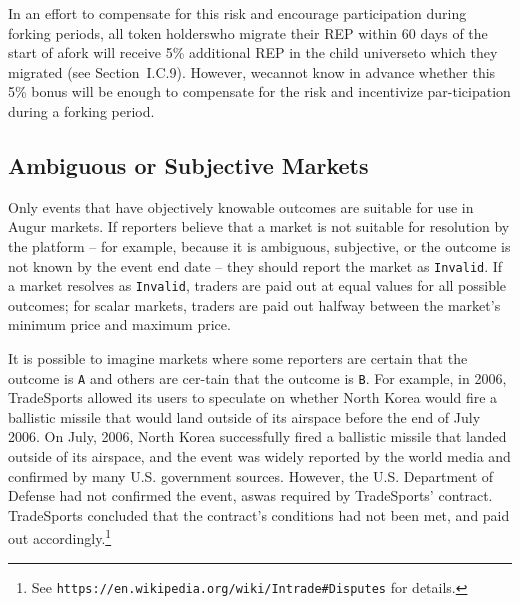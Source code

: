\documentclass[12pt,floatfix,reprint,nofootinbib,amsmath,amssymb,epsfig,pre,floats,letterpaper,groupedaffiliation]{revtex4-1}
\theoremstyle{definition}
\theoremstyle{definition}
\begin{document}
In an effort to compensate for this risk and encour\-age participation during forking periods, all token holders\linebreak who migrate their REP within 60 days of the start of a\linebreak fork will receive 5\% additional REP in the child universe\linebreak to which they migrated (see Section~I.C.9). However, we\linebreak cannot know in advance whether this 5\% bonus will be enough to compensate for the risk and incentivize par-\linebreak \vspace{-\baselineskip}ticipation during a forking period.

\subsection{Ambiguous or Subjective Markets}\label{section:ambiguous_or_subjective_markets}

Only events that have objectively knowable outcomes are suitable for use in Augur markets. If reporters be\-lieve that a market is not suitable for resolution by the platform -- for example, because it is ambiguous, subjec\-tive, or the outcome is not known by the event end date -- they should report the market as \texttt{Invalid}. If a market resolves as \texttt{Invalid}, traders are paid out at equal values for all possible outcomes; for scalar markets, traders are paid out halfway between the market's minimum price and maximum price.

It is possible to imagine markets where some reporters are certain that the outcome is \texttt{A} and others are cer-\linebreak tain that the outcome is \texttt{B}. For example, in 2006, TradeSports allowed its users to speculate on whether North Korea would fire a ballistic missile that would land outside of its airspace before the end of July 2006. On July, 2006, North Korea successfully fired a ballistic missile that landed outside of its airspace, and the event was widely reported by the world media and confirmed by many U.S. government sources. However, the U.S. Department of Defense had not confirmed the event, as\linebreak was required by TradeSports' contract. TradeSports concluded that the contract's conditions had not been met, and paid out accordingly.\footnote{See \texttt{https://en.wikipedia.org/wiki/Intrade\#Disputes} for details.}
\end{document}
